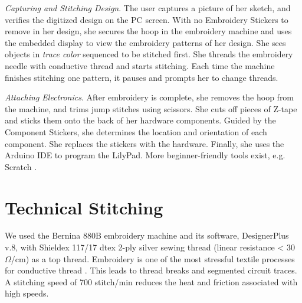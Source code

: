 \documentclass[header.tex]{subfiles}
\begin{document}
\textit{Capturing and Stitching Design}. The user captures a picture of her sketch, and verifies the digitized design on the PC screen.
With no Embroidery Stickers to remove in her design, she secures the hoop in the embroidery machine and uses the embedded display to view the embroidery patterns of her design. She sees objects in \textit{trace color} sequenced to be stitched first. She threads the embroidery needle with conductive thread and starts stitching. Each time the machine finishes stitching one pattern, it pauses and prompts her to change threads. 

\textit{Attaching Electronics}. After embroidery is complete, she removes the hoop from the machine, and trims jump stitches using scissors. She cuts off pieces of Z-tape and sticks them onto the back of her hardware components. Guided by the Component Stickers, she determines the location and orientation of each component. She replaces the stickers with the hardware. Finally, she uses the Arduino IDE to program the LilyPad. More
beginner-friendly tools exist, e.g. Scratch \cite{Resnick:2009:SP:1592761.1592779}. %





\section{Technical Stitching}
We used the Bernina 880B
embroidery machine and its software, DesignerPlus v.8, with Shieldex 117/17 dtex 2-ply silver sewing thread (linear resistance < 30 $\Omega$/cm) as a top thread.
Embroidery is one of the most stressful textile processes for conductive thread \cite{5387040}. This leads to thread breaks and segmented circuit traces. A stitching speed of 700 stitch/min reduces the heat and friction associated with high speeds. %
\end{document}
